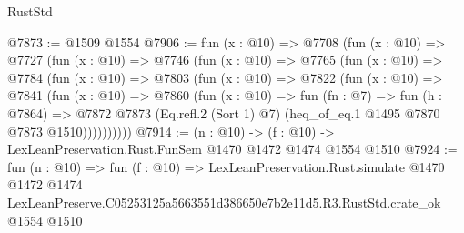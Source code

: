 \begin{lexlean}{RustStd}
\begin{coremodule}
@7873 := @1509 @1554
@7906 := fun (x : @10) =>
  @7708
    (fun (x : @10) =>
    @7727
      (fun (x : @10) =>
      @7746
        (fun (x : @10) =>
        @7765
          (fun (x : @10) =>
          @7784
            (fun (x : @10) =>
            @7803
              (fun (x : @10) =>
              @7822
                (fun (x : @10) =>
                @7841
                  (fun (x : @10) =>
                  @7860
                    (fun (x : @10) =>
                    fun (fn : @7) =>
                    fun (h : @7864) =>
                    @7872
                      @7873
                      (Eq.refl.{2} (Sort 1) @7)
                      (heq_of_eq.{1} @1495 @7870 @7873 @1510))))))))))
@7914 := (n : @10) -> (f : @10) -> LexLeanPreservation.Rust.FunSem @1470 @1472 @1474 @1554 @1510
@7924 := fun (n : @10) =>
  fun (f : @10) =>
  LexLeanPreservation.Rust.simulate
    @1470
    @1472
    @1474
    LexLeanPreserve.C05253125a5663551d386650e7b2e11d5.R3.RustStd.crate_ok
    @1554
    @1510
\end{coremodule}
\end{lexlean}
